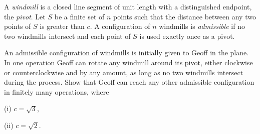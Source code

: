 A \textit{windmill} is a closed line segment of unit length with a distinguished endpoint, the \textit{pivot}. Let $S$ be a finite set of $n$ points such that the distance between any two points of $S$ is greater than $c$. A configuration of $n$ windmills is \textit{admissible} if no two windmills intersect and each point of $S$ is used exactly once as a pivot.

An admissible configuration of windmills is initially given to Geoff in the plane. In one operation Geoff can rotate any windmill around its pivot, either clockwise or counterclockwise and by any amount, as long as no two windmills intersect during the process. Show that Geoff can reach any other admissible configuration in finitely many operations, where

(i) $c = \sqrt 3$,

(ii) $c = \sqrt 2$.

